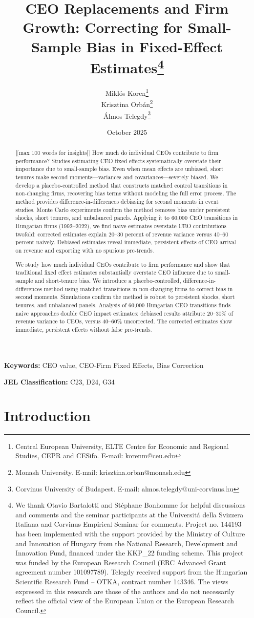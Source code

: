 \documentclass[11pt,a4paper]{article}
\title{CEO Replacements and Firm Growth: Correcting for Small-Sample Bias in Fixed-Effect Estimates\thanks{We thank Otavio Bartalotti and St\'ephane Bonhomme for helpful discussions and comments and the seminar participants at the Universit\'a della Svizzera Italiana and Corvinus Empirical Seminar for comments. Project no. 144193 has been implemented with the support provided by the Ministry of Culture and Innovation of Hungary from the National Research, Development and Innovation Fund, financed under the KKP\_22 funding scheme. This project was funded by the European Research Council (ERC Advanced Grant agreement number 101097789). Telegdy received support from the Hungarian Scientific Research Fund – OTKA, contract number 143346. The views expressed in this research are those of the authors and do not necessarily reflect the official view of the European Union or the European Research Council.}}
\author{Miklós Koren\thanks{Central European University, ELTE Centre for Economic and Regional Studies, CEPR and CESifo. E-mail: korenm@ceu.edu} \\
        Krisztina Orbán\thanks{Monash University. E-mail: krisztina.orban@monash.edu} \\
        Álmos Telegdy\thanks{Corvinus University of Budapest. E-mail: almos.telegdy@uni-corvinus.hu}}
\date{October 2025}
\begin{document}
\maketitle
\thispagestyle{empty}

\begin{abstract}[[max 100 words for insights]]
How much do individual CEOs contribute to firm performance? Studies estimating CEO fixed effects systematically overstate their importance due to small-sample bias. Even when mean effects are unbiased, short tenures make second moments---variances and covariances---severely biased. We develop a placebo-controlled method that constructs matched control transitions in non-changing firms, recovering bias terms without modeling the full error process. The method provides difference-in-differences debiasing for second moments in event studies. Monte Carlo experiments confirm the method removes bias under persistent shocks, short tenures, and unbalanced panels. Applying it to 60,000 CEO transitions in Hungarian firms (1992--2022), we find naive estimates overstate CEO contributions twofold: corrected estimates explain 20--30 percent of revenue variance versus 40--60 percent naively. Debiased estimates reveal immediate, persistent effects of CEO arrival on revenue and exporting with no spurious pre-trends.

\noindent
We study how much individual CEOs contribute to firm performance and show that traditional fixed effect estimates substantially overstate CEO influence due to small-sample and short-tenure bias. We introduce a placebo-controlled, difference-in-differences method using matched transitions in non-changing firms to correct bias in second moments. Simulations confirm the method is robust to persistent shocks, short tenures, and unbalanced panels. Analysis of 60,000 Hungarian CEO transitions finds naive approaches double CEO impact estimates: debiased results attribute 20–30\% of revenue variance to CEOs, versus 40–60\% uncorrected. The corrected estimates show immediate, persistent effects without false pre-trends.
\end{abstract}

\textbf{Keywords:} CEO value, CEO-Firm Fixed Effects, Bias Correction

\textbf{JEL Classification:} C23, D24, G34

\clearpage
\setcounter{page}{1}

\section{Introduction}
\end{document}
